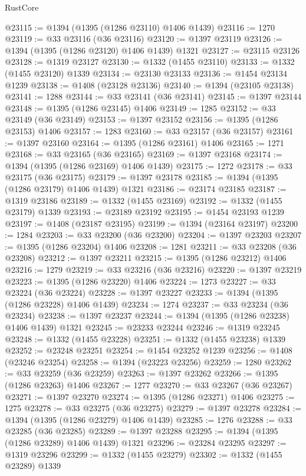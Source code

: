\begin{lexlean}{RustCore}
\begin{coremodule}
@23115 := @1394 (@1395 (@1286 @23110) @1406 @1439)
@23116 := 1270
@23119 := @33 @23116 (@36 @23116)
@23120 := @1397 @23119
@23126 := @1394 (@1395 (@1286 @23120) @1406 @1439) @1321
@23127 := @23115 @23126
@23128 := @1319 @23127
@23130 := @1332 (@1455 @23110)
@23133 := @1332 (@1455 @23120) @1339
@23134 := @23130 @23133
@23136 := @1454 @23134 @1239
@23138 := @1408 (@23128 @23136)
@23140 := @1394 (@23105 @23138)
@23141 := 1288
@23144 := @33 @23141 (@36 @23141)
@23145 := @1397 @23144
@23148 := @1395 (@1286 @23145) @1406
@23149 := 1285
@23152 := @33 @23149 (@36 @23149)
@23153 := @1397 @23152
@23156 := @1395 (@1286 @23153) @1406
@23157 := 1283
@23160 := @33 @23157 (@36 @23157)
@23161 := @1397 @23160
@23164 := @1395 (@1286 @23161) @1406
@23165 := 1271
@23168 := @33 @23165 (@36 @23165)
@23169 := @1397 @23168
@23174 := @1394 (@1395 (@1286 @23169) @1406 @1439)
@23175 := 1272
@23178 := @33 @23175 (@36 @23175)
@23179 := @1397 @23178
@23185 := @1394 (@1395 (@1286 @23179) @1406 @1439) @1321
@23186 := @23174 @23185
@23187 := @1319 @23186
@23189 := @1332 (@1455 @23169)
@23192 := @1332 (@1455 @23179) @1339
@23193 := @23189 @23192
@23195 := @1454 @23193 @1239
@23197 := @1408 (@23187 @23195)
@23199 := @1394 (@23164 @23197)
@23200 := 1284
@23203 := @33 @23200 (@36 @23200)
@23204 := @1397 @23203
@23207 := @1395 (@1286 @23204) @1406
@23208 := 1281
@23211 := @33 @23208 (@36 @23208)
@23212 := @1397 @23211
@23215 := @1395 (@1286 @23212) @1406
@23216 := 1279
@23219 := @33 @23216 (@36 @23216)
@23220 := @1397 @23219
@23223 := @1395 (@1286 @23220) @1406
@23224 := 1273
@23227 := @33 @23224 (@36 @23224)
@23228 := @1397 @23227
@23233 := @1394 (@1395 (@1286 @23228) @1406 @1439)
@23234 := 1274
@23237 := @33 @23234 (@36 @23234)
@23238 := @1397 @23237
@23244 := @1394 (@1395 (@1286 @23238) @1406 @1439) @1321
@23245 := @23233 @23244
@23246 := @1319 @23245
@23248 := @1332 (@1455 @23228)
@23251 := @1332 (@1455 @23238) @1339
@23252 := @23248 @23251
@23254 := @1454 @23252 @1239
@23256 := @1408 (@23246 @23254)
@23258 := @1394 (@23223 @23256)
@23259 := 1280
@23262 := @33 @23259 (@36 @23259)
@23263 := @1397 @23262
@23266 := @1395 (@1286 @23263) @1406
@23267 := 1277
@23270 := @33 @23267 (@36 @23267)
@23271 := @1397 @23270
@23274 := @1395 (@1286 @23271) @1406
@23275 := 1275
@23278 := @33 @23275 (@36 @23275)
@23279 := @1397 @23278
@23284 := @1394 (@1395 (@1286 @23279) @1406 @1439)
@23285 := 1276
@23288 := @33 @23285 (@36 @23285)
@23289 := @1397 @23288
@23295 := @1394 (@1395 (@1286 @23289) @1406 @1439) @1321
@23296 := @23284 @23295
@23297 := @1319 @23296
@23299 := @1332 (@1455 @23279)
@23302 := @1332 (@1455 @23289) @1339

\end{coremodule}
\end{lexlean}
